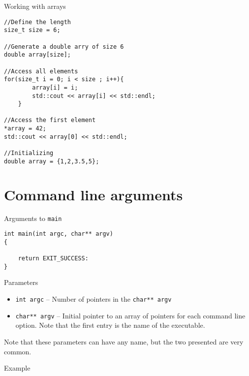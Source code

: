 \documentclass[12pt,t]{beamer}
\begin{document}
\begin{frame}[fragile]{Working with arrays}

\begin{lstlisting}
//Define the length
size_t size = 6;

//Generate a double arry of size 6
double array[size];

//Access all elements
for(size_t i = 0; i < size ; i++){
        array[i] = i;
        std::cout << array[i] << std::endl;
    }

//Access the first element
*array = 42;
std::cout << array[0] << std::endl;

//Initializing 
double array = {1,2,3.5,5};
\end{lstlisting}

\end{frame}



\section{Command line arguments}

\begin{frame}[fragile]{Arguments to \lstinline|main|}

\begin{lstlisting}
int main(int argc, char** argv)
{

	return EXIT_SUCCESS:
}
\end{lstlisting}

\begin{block}{Parameters}
\begin{itemize}
\item \lstinline|int argc| -- Number of pointers in the \lstinline|char** argv|
\item \lstinline|char** argv| -- Initial pointer to an array of pointers for each command line option. Note that the first entry is the name of the executable.
\end{itemize}
\end{block}
Note that these parameters can have any name, but the two presented are very common.
\end{frame}


\begin{frame}[fragile]{Example}



\end{frame}
\end{document}
